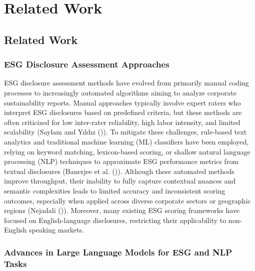 \documentclass[
  12pt,
]{article}
\begin{document}
\section{Related Work}\label{related-work}

\subsection{Related Work}\label{related-work-1}

\subsubsection{ESG Disclosure Assessment
Approaches}\label{esg-disclosure-assessment-approaches}

ESG disclosure assessment methods have evolved from primarily manual
coding processes to increasingly automated algorithms aiming to analyze
corporate sustainability reports. Manual approaches typically involve
expert raters who interpret ESG disclosures based on predefined
criteria, but these methods are often criticized for low inter-rater
reliability, high labor intensity, and limited scalability (Saylam and
Yıldız ()). To mitigate these challenges,
rule-based text analytics and traditional machine learning (ML)
classifiers have been employed, relying on keyword matching,
lexicon-based scoring, or shallow natural language processing (NLP)
techniques to approximate ESG performance metrics from textual
disclosures (Banerjee et al. ()).
Although these automated methods improve throughput, their inability to
fully capture contextual nuances and semantic complexities leads to
limited accuracy and inconsistent scoring outcomes, especially when
applied across diverse corporate sectors or geographic regions (Nejadali
()). Moreover, many existing ESG
scoring frameworks have focused on English-language disclosures,
restricting their applicability to non-English speaking markets.

\subsubsection{Advances in Large Language Models for ESG and NLP
Tasks}\label{advances-in-large-language-models-for-esg-and-nlp-tasks}
\end{document}
